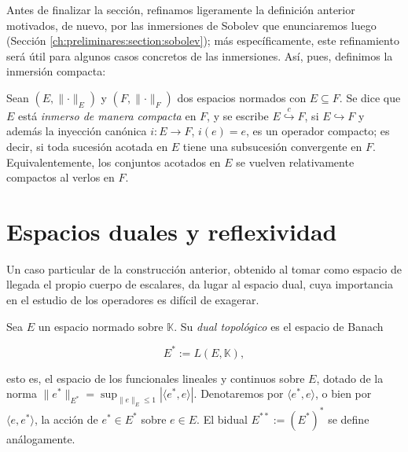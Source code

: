 Antes de finalizar la sección, refinamos ligeramente la definición anterior motivados, de nuevo, por las inmersiones de Sobolev que enunciaremos luego (Sección \ref{ch:preliminares:section:sobolev}); más específicamente, este refinamiento será útil para algunos casos concretos de las inmersiones. Así, pues, definimos la inmersión compacta:\\

\begin{Definicion}
\label{ch:preliminares:def:inmersionCompacta}

Sean $(E, \lVert \cdot \rVert_E)$ y $(F, \lVert \cdot \rVert_F)$ dos espacios
normados con $E \subseteq F$. Se dice que $E$ está \textit{inmerso de manera compacta}
en $F$, y se escribe $E \overset{c}{\hookrightarrow} F$, si $E \hookrightarrow F$ y además la inyección canónica
$i : E \rightarrow F$, $i(e) = e$, es un operador compacto; es decir, si toda sucesión acotada en $E$ tiene una subsucesión convergente en $F$. Equivalentemente, los conjuntos acotados en $E$ se vuelven relativamente compactos al verlos en $F$.
\end{Definicion}

\section{Espacios duales y reflexividad}
\label{ch:preliminares:section:dual}

Un caso particular de la construcción anterior, obtenido al tomar como espacio de
llegada el propio cuerpo de escalares, da lugar al espacio dual, cuya importancia
en el estudio de los operadores es difícil de exagerar.\\

\begin{Definicion}
\label{ch:preliminares:def:dual}

Sea $E$ un espacio normado sobre $\mathbb{K}$. Su \textit{dual topológico} es el
espacio de Banach

\[E^* := L(E, \mathbb{K}),\]

esto es, el espacio de los funcionales lineales y continuos sobre $E$, dotado de
la norma $\lVert e^* \rVert_{E^*} = \sup_{\lVert e \rVert_E \leq 1} |\langle e^*, e \rangle|$.
Denotaremos por $\langle e^*, e \rangle$, o bien por $\langle e, e^* \rangle$, la
acción de $e^* \in E^*$ sobre $e \in E$. El bidual $E^{**} := (E^*)^*$ se define
análogamente.
\end{Definicion}

